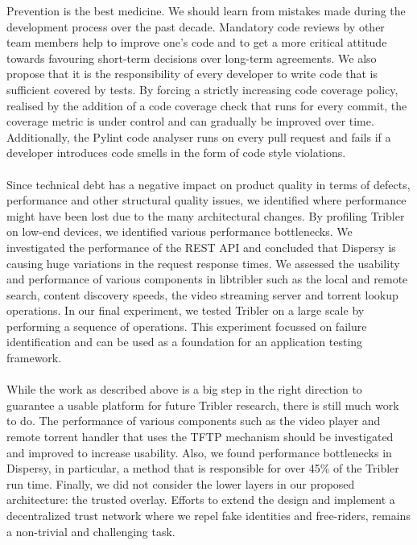 Prevention is the best medicine. We should learn from mistakes made during the development process over the past decade. Mandatory code reviews by other team members help to improve one's code and to get a more critical attitude towards favouring short-term decisions over long-term agreements. We also propose that it is the responsibility of every developer to write code that is sufficient covered by tests. By forcing a strictly increasing code coverage policy, realised by the addition of a code coverage check that runs for every commit, the coverage metric is under control and can gradually be improved over time. Additionally, the Pylint code analyser runs on every pull request and fails if a developer introduces code smells in the form of code style violations.\\\\
Since technical debt has a negative impact on product quality in terms of defects, performance and other structural quality issues, we identified where performance might have been lost due to the many architectural changes. By profiling Tribler on low-end devices, we identified various performance bottlenecks. We investigated the performance of the REST API and concluded that Dispersy is causing huge variations in the request response times. We assessed the usability and performance of various components in libtribler such as the local and remote search, content discovery speeds, the video streaming server and torrent lookup operations. In our final experiment, we tested Tribler on a large scale by performing a sequence of operations. This experiment focussed on failure identification and can be used as a foundation for an application testing framework.\\\\
While the work as described above is a big step in the right direction to guarantee a usable platform for future Tribler research, there is still much work to do. The performance of various components such as the video player and remote torrent handler that uses the TFTP mechanism should be investigated and improved to increase usability. Also, we found performance bottlenecks in Dispersy, in particular, a method that is responsible for over 45\% of the Tribler run time. Finally, we did not consider the lower layers in our proposed architecture: the trusted overlay. Efforts to extend the design and implement a decentralized trust network where we repel fake identities and free-riders, remains a non-trivial and challenging task.

